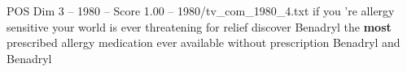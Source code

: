 \begin{textsample}{POS Dim 3 – 1980 – Score 1.00 – 1980/tv\_com\_1980\_4.txt}  \label{ex:f3_pos_057}
if you 're allergy sensitive your world is ever threatening for relief discover Benadryl the \textbf{most} prescribed allergy medication ever available without prescription Benadryl and Benadryl

\end{textsample}
